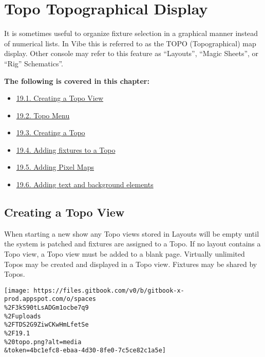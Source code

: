 \documentclass[
]{article}
\providecommand{\tightlist}{%
  \setlength{\itemsep}{0pt}\setlength{\parskip}{0pt}}
\begin{document}
\hypertarget{topo-topographical-display}{%
\section{Topo Topographical Display}\label{topo-topographical-display}}

It is sometimes useful to organize fixture selection in a graphical manner instead of numerical lists. In Vibe this is referred to as the TOPO (Topographical) map display. Other console may refer to this feature as ``Layouts'', ``Magic Sheets'', or ``Rig'' Schematics''.

\textbf{The following is covered in this chapter:}

\begin{itemize}
\tightlist
\item
  \href{https://vibemanual.compulite.com/topo-topographical-display.html\#creating-a-topo-view}{19.1. Creating a Topo View}
\item
  \href{https://vibemanual.compulite.com/topo-topographical-display.html\#topo-menu}{19.2. Topo Menu}
\item
  \href{https://vibemanual.compulite.com/topo-topographical-display.html\#creating-a-topo}{19.3. Creating a Topo}
\item
  \href{https://vibemanual.compulite.com/topo-topographical-display.html\#adding-fixtures-to-a-topo}{19.4. Adding fixtures to a Topo}
\item
  \href{https://vibemanual.compulite.com/topo-topographical-display.html\#adding-pixel-maps}{19.5. Adding Pixel Maps}
\item
  \href{https://vibemanual.compulite.com/topo-topographical-display.html\#adding-text-and-background-elements}{19.6. Adding text and background elements}
\end{itemize}

\hypertarget{creating-a-topo-view}{%
\subsection{Creating a Topo View}\label{creating-a-topo-view}}

When starting a new show any Topo views stored in Layouts will be empty until the system is patched and fixtures are assigned to a Topo. If no layout contains a Topo view, a Topo view must be added to a blank page. Virtually unlimited Topos may be created and displayed in a Topo view. Fixtures may be shared by Topos.

\texttt{[image: https://files.gitbook.com/v0/b/gitbook-x-prod.appspot.com/o/spaces\\\%2F3kS90tLsADGm1ocbe7q9\\\%2Fuploads\\\%2FTDS2G9ZiwCKwHmLfetSe\\\%2F19.1\\\%20topo.png?alt=media\\\&token=4bc1efc8-ebaa-4d30-8fe0-7c5ce82c1a5e]}
\end{document}

